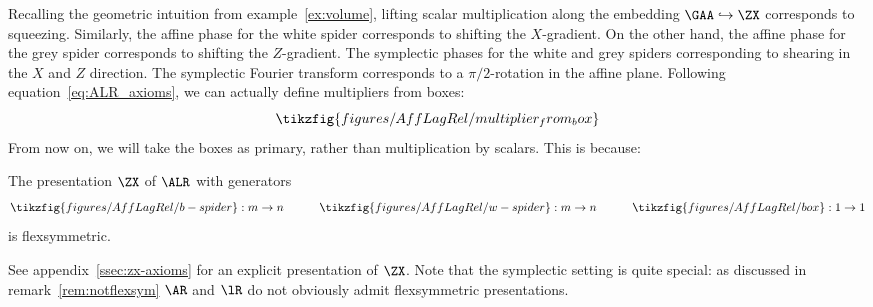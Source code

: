 Recalling the geometric intuition from example~\ref{ex:volume}, lifting scalar multiplication along the embedding \(\GAA\hookrightarrow\ZX\) corresponds to squeezing.  Similarly, the affine phase for the white spider corresponds to shifting the \(X\)-gradient.  On the other hand, the affine phase for the grey spider corresponds to shifting the \(Z\)-gradient.  The symplectic phases for the white and grey spiders corresponding to shearing in the \(X\) and \(Z\) direction.  The symplectic Fourier transform corresponds to a \(\pi/2\)-rotation in the affine plane.
Following equation~\eqref{eq:ALR_axioms}, we can actually define multipliers
from boxes:
\[\tikzfig{figures/AffLagRel/multiplier_from_box}\]
From now on,
we will take the boxes as primary, rather than multiplication by scalars.
This is because:
\begin{proposition}
  The presentation  \(\ZX\)  of \(\ALR\) with generators
  \begin{equation*}
    \tikzfig{figures/AffLagRel/b-spider} : m \to n  \quad\quad\quad
    \tikzfig{figures/AffLagRel/w-spider} : m \to n  \quad\quad\quad
    \tikzfig{figures/AffLagRel/box} : 1 \to 1 
  \end{equation*}
  is flexsymmetric.
\end{proposition}
See appendix~\ref{ssec:zx-axioms} for an explicit presentation of \(\ZX\).
Note that the symplectic setting is quite special: as discussed in remark~\ref{rem:notflexsym} \(\AR\) and \(\lR\) do not obviously admit flexsymmetric presentations. 
